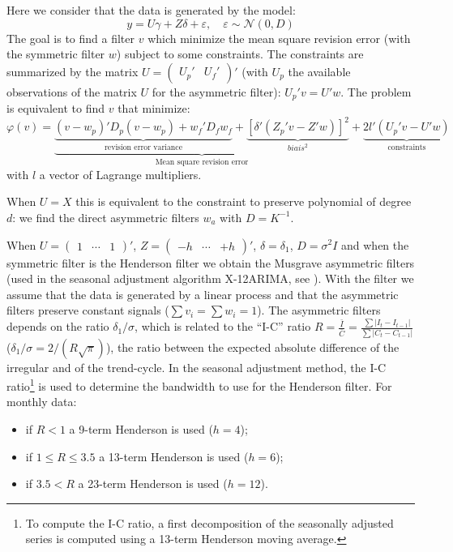 \documentclass[
  12pt,
  ,
  a4paper]{article}
\newcommand\1{\mathds{1}}
\begin{document}
Here we consider that the data is generated by the model:
\[
y=U\gamma+Z\delta+\varepsilon,\quad
\varepsilon\sim\mathcal{N}(0,D)
\]
The goal is to find a filter \(v\) which minimize the mean square revision error (with the symmetric filter \(w\)) subject to some constraints.
The constraints are summarized by the matrix \(U=\begin{pmatrix}U_{p}'&U_{f}'\end{pmatrix}'\) (with \(U_p\) the available observations of the matrix \(U\) for the asymmetric filter): \(U_p'v=U'w\).
The problem is equivalent to find \(v\) that minimize:
\begin{equation}
\varphi(v)=
\underbrace{
  \underbrace{(v-w_{p})'D_{p}(v-w_{p})+
  w_{f}'D_{f}w_{f}}_\text{revision error variance}+
  \underbrace{[\delta'(Z_{p}'v-Z'w)]^{2}}_{biais^2}
}_\text{Mean square revision error}+
\underbrace{2l'(U_{p}'v-U'w)}_{\text{constraints}}
\label{eq:lppasym}
\end{equation}
with \(l\) a vector of Lagrange multipliers.

When \(U=X\) this is equivalent to the constraint to preserve polynomial of degree \(d\): we find the direct asymmetric filters \(w_a\) with \(D=K^{-1}\).

When \(U=\begin{pmatrix}1&\cdots&1\end{pmatrix}'\), \(Z=\begin{pmatrix}-h&\cdots&+h\end{pmatrix}'\), \(\delta=\delta_1\), \(D=\sigma^2I\) and when the symmetric filter is the Henderson filter we obtain the Musgrave asymmetric filters (used in the seasonal adjustment algorithm X-12ARIMA, see \textcite{musgrave1964set}).
With the filter we assume that the data is generated by a linear process and that the asymmetric filters preserve constant signals (\(\sum v_i=\sum w_i=1\)).
The asymmetric filters depends on the ratio \(\delta_1/\sigma\), which is related to the ``I-C'' ratio \(R=\frac{\bar{I}}{\bar{C}}=\frac{\sum\lvert I_t-I_{t-1}\rvert}{\sum\lvert C_t-C_{t-1}\rvert}\) (\(\delta_1/\sigma=2/(R\sqrt{\pi})\)), the ratio between the expected absolute difference of the irregular and of the trend-cycle.
In the seasonal adjustment method, the I-C ratio\footnote{To compute the I-C ratio, a first decomposition of the seasonally adjusted series is computed using a 13-term Henderson moving average.} is used to determine the bandwidth to use for the Henderson filter. For monthly data:

\begin{itemize}
\item
  if \(R<1\) a 9-term Henderson is used (\(h=4\));
\item
  if \(1\leq R\leq3.5\) a 13-term Henderson is used (\(h=6\));
\item
  if \(3.5< R\) a 23-term Henderson is used (\(h=12\)).
\end{itemize}
\end{document}
